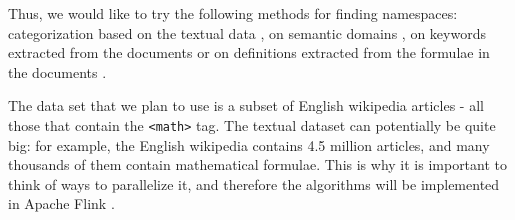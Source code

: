 Thus, we would like to try the following methods for finding namespaces: categorization based on the textual data \cite{sebastiani2002machine}, on semantic domains \cite{gliozzo2009semantic}, on keywords extracted from the documents \cite{schoneberg2014pos} or on definitions extracted from the formulae in the documents \cite{pagael2014mlp}.

The data set that we plan to use is a subset of English wikipedia articles - all those that contain the \texttt{<math>} tag. The textual dataset can potentially be quite big: for example, the English wikipedia contains 4.5 million articles, and many thousands of them contain mathematical formulae. This is why it is important to think of ways to parallelize it, and therefore the algorithms will be implemented in Apache Flink \cite{source:flink}.

